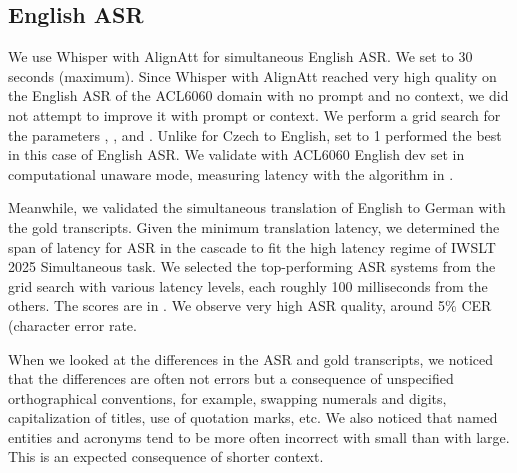 \documentclass[11pt]{article}
\begin{document}
\subsection{English ASR}

We use Whisper with AlignAtt for simultaneous English ASR. We set \BufferLen{} to 30 seconds (maximum). Since Whisper with AlignAtt reached very high quality on the English ASR of the ACL6060 domain with no prompt and no context, we did not attempt to improve it with prompt or context. We perform a grid search for the parameters \MinChunkSize{}, \Frames{}, and \Beams{}. Unlike for Czech to English, \Beams{} set to 1 performed the best in this case of English ASR. We validate with ACL6060 English dev set in computational unaware mode, measuring latency with the algorithm in .

Meanwhile, we validated the simultaneous translation of English to German with the gold transcripts. Given the minimum translation latency, we determined the span of latency for ASR in the cascade to fit the high latency regime of IWSLT 2025 Simultaneous task. We selected the top-performing ASR systems from the grid search with various latency levels, each roughly 100 milliseconds from the others. The scores are in . We observe very high ASR quality, around 5\% CER (character error rate.

When we looked at the differences in the ASR and gold transcripts, we noticed that the differences are often not errors but a consequence of unspecified orthographical conventions, for example, swapping numerals and digits, capitalization of titles, use of quotation marks, etc. We also noticed that named entities and acronyms tend to be more often incorrect with small \MinChunkSize{} than with large. This is an expected consequence of shorter context. %
\end{document}
